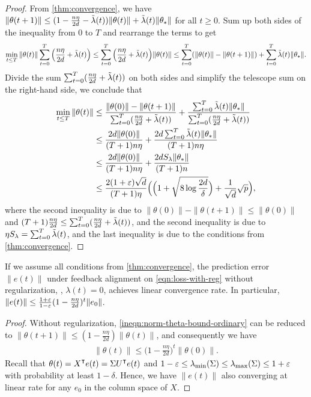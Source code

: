 \begin{proof}
    From \cref{thm:convergence}, we have $\|\theta(t+1)\| \leq (1-\frac{n\eta}{2d}-\tilde{\lambda}(t))\|\theta(t)\| + \tilde{\lambda}(t)\|\theta_\ast\|$ for all $t\geq 0$. Sum up both sides of the inequality from $0$ to $T$ and rearrange the terms to get
    \begin{align*}
        \min_{t\leq T} \|\theta(t)\|\sum_{t=0}^T \Big(\frac{n\eta}{2d}+\tilde{\lambda}(t)\Big) \leq \sum_{t=0}^T \Big(\frac{n\eta}{2d}+\tilde{\lambda}(t)\Big)\|\theta(t)\| \leq \sum_{t=0}^T (\|\theta(t)\|- \|\theta(t+1)\|) + \sum_{t=0}^T \tilde{\lambda}(t)\|\theta_\ast\|.
    \end{align*}
    Divide the sum $\sum_{t=0}^T (\frac{n\eta}{2d}+\tilde{\lambda}(t))$ on both sides and simplify the telescope sum on the right-hand side, we conclude that
    \begin{align*}
        \min_{t\leq T}\|\theta(t)\| & \leq \frac{\|\theta(0)\| - \|\theta(t+1)\|}{\sum_{t=0}^T (\frac{n\eta}{2d}+\tilde{\lambda}(t))} + \frac{\sum_{t=0}^T \tilde{\lambda}(t)\|\theta_\ast\|}{\sum_{t=0}^T (\frac{n\eta}{2d}+\tilde{\lambda}(t))} \\
        & \leq \frac{2d\|\theta(0)\|}{(T+1)n\eta} + \frac{2d\sum_{t=0}^T \tilde{\lambda}(t)\|\theta_\ast\|}{(T+1)n\eta} \\
        & \leq \frac{2d\|\theta(0)\|}{(T+1)n\eta} + \frac{2d S_\lambda\|\theta_\ast\|}{(T+1)n} \\
        & \leq \frac{2(1+\varepsilon)\sqrt{d}}{(T+1)\eta} \Big( \Big(1 + \sqrt{8\log\frac{2d}{\delta}}\Big) + \frac{1}{\sqrt{d}}\sqrt{p} \Big),
    \end{align*}
    where the second inequality is due to $\|\theta(0)\| - \|\theta(t+1)\| \leq \|\theta(0)\|$ and $(T+1)\frac{n\eta}{2d} \leq \sum_{t=0}^T (\frac{n\eta}{2d}+\tilde{\lambda}(t))$, and the second inequality is due to $\eta S_\lambda = \sum_{t=0}^T \tilde{\lambda}(t)$, and the last inequality is due to the conditions from \cref{thm:convergence}.
\end{proof}

\begin{corollary}\label{cor:convergence-without-reg}
    If we assume all conditions from \cref{thm:convergence}, the prediction error $\|e(t)\|$ under feedback alignment on \eqref{eqn:loss-with-reg} without regularization, \ie, $\lambda(t) = 0$, achieves linear convergence rate. In particular, $\|e(t)\| \leq \frac{1+\varepsilon}{1-\varepsilon}(1-\frac{n\eta}{2d})^t \|e_0\|$.
\end{corollary}

\begin{proof}
    Without regularization, \cref{ineqn:norm-theta-bound-ordinary} can be reduced to $\|\theta(t+1)\| \leq (1-\frac{n\eta}{2d}) \|\theta(t)\|$, and consequently we have
    \begin{align*}
        \|\theta(t)\| \leq \Big(1-\frac{n\eta}{2d}\Big)^t \|\theta(0)\|.
    \end{align*}
    Recall that $\theta(t) = X\transpose e(t) = \Sigma U\transpose e(t)$ and $1-\varepsilon\leq \lambda_{\mathrm{min}}(\Sigma)\leq \lambda_{\mathrm{max}}(\Sigma)\leq 1+\varepsilon$ with probability at least $1-\delta$. Hence, we have $\|e(t)\|$ also converging at linear rate for any $e_0$ in the column space of $X$.
\end{proof}

